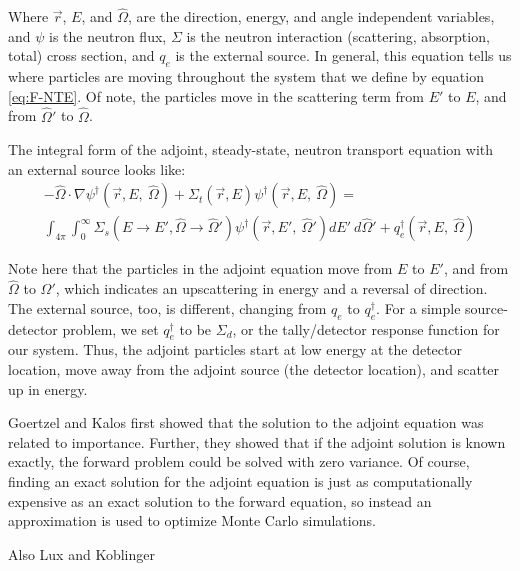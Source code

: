 Where $\vec { r }$, $E$, and $\hat\Omega$, are the direction, energy, and angle independent variables, and $\psi$ is the neutron flux, $\Sigma$ is the neutron interaction (scattering, absorption, total) cross section, and $q_{e}$ is the external source. In general, this equation tells us where particles are moving throughout the system that we define by equation \ref{eq:F-NTE}. Of note, the particles move in the scattering term from $E'$ to $E$, and from $\hat\Omega'$ to $\hat\Omega$. 

The integral form of the adjoint, steady-state, neutron transport equation with an external source looks like:
\begin{multline}
-\hat\Omega \cdot \nabla \psi^{\dagger} (\vec {r} ,E,\:\hat\Omega)+\Sigma _{ t }(\vec{r},E)\psi^{\dagger}  (\vec { r } ,E,\:\hat\Omega)
= \\  
 \int _{ 4\pi  } \int _{ 0 }^{ \infty  } \Sigma _{ s }(E\rightarrow E', \hat\Omega\rightarrow\hat\Omega')\psi^{\dagger}  (\vec { r } ,E',\: \hat\Omega')dE' \:d\hat\Omega' + q_{e}^\dagger(\vec { r } ,E, \:\hat\Omega)
\end{multline}
\label{eq:A-NTE}


Note here that the particles in the adjoint equation move from $E$ to $E'$, and from $\hat\Omega$ to $\hat\Omega'$, which indicates an upscattering in energy and a reversal of direction. The external source, too, is different, changing from $q_{e}$ to $q_{e}^\dagger$. For a simple source-detector problem, we set $q_{e}^\dagger$ to be $\Sigma _{ d }$, or the tally/detector response function for our system. Thus, the adjoint particles start at low energy at the detector location, move away from the adjoint source (the detector location), and scatter up in energy. 

Goertzel \cite{goertzel_monte_1958} and Kalos \cite{kalos_importance_1963} first showed that the solution to the adjoint equation was related to importance. Further, they showed that if the adjoint solution is known exactly, the forward problem could be solved with zero variance. Of course, finding an exact solution for the adjoint equation is just as computationally expensive as an exact solution to the forward equation, so instead an approximation is used to optimize Monte Carlo simulations. 

Also Lux and Koblinger \cite{lux_monte_carlo}

